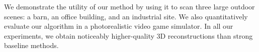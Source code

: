 We demonstrate the utility of our method by using it to scan three large outdoor scenes: a barn, an office building, and an industrial site.
We also quantitatively evaluate our algorithm in a photorealistic video game simulator.
In all our experiments, we obtain noticeably higher-quality 3D reconstructions than strong baseline methods.
%


